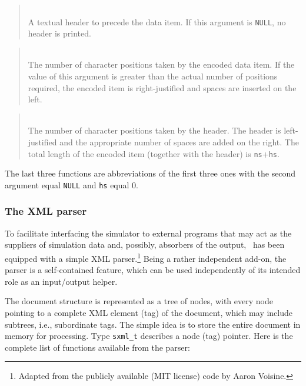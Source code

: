 \begin{quote}
\noindent{}\\ \hspace{0in}
A textual header to precede the data item.
If this argument is {\tt NULL}, no header is printed.
\end{quote}

\begin{quote}
\noindent{}\\ \hspace{0in}
The number of character positions taken by the encoded data item.
If the value of this argument is greater than the actual number of positions
required, the encoded item is right-justified and spaces are inserted on the
left.
\end{quote}

\begin{quote}
\noindent{}\\ \hspace{0in}
The number of character positions taken by the header.
The header is left-justified and the appropriate number of spaces are added
on the right.
The total length of the encoded item (together with the header) is
{\tt ns}+{\tt hs}.
\end{quote}\medskip

The last three functions are abbreviations of the first three ones with
the second argument equal {\tt NULL} and {\tt hs} equal 0.

\subsubsection{The XML parser}
\label{rm_au_io_xm}

To facilitate interfacing the simulator to external programs that may act as
the suppliers of simulation data and, possibly, absorbers of the output, 
\smurph\ has been equipped with a simple XML
parser.\footnote{Adapted from the publicly available (MIT license)
code by Aaron Voisine.}
Being a rather independent add-on,
the parser is a self-contained feature, which can be used
independently of its intended role as an input/output helper.

The document structure is represented as a tree of nodes, with every node
pointing to a complete XML element (tag)
of the document, which may include subtrees,
i.e., subordinate tags.
The simple idea is to store the entire document in memory for processing.
Type {\tt sxml\_t} describes a node (tag) pointer.
Here is the complete list of functions available from the parser:

